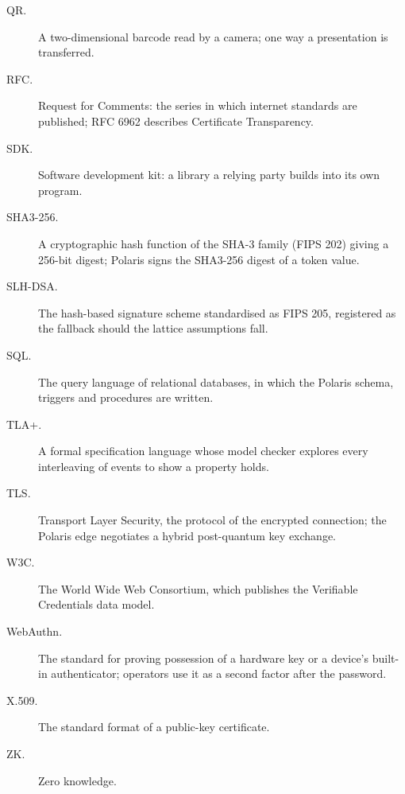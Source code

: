 \begin{description}
  \item[QR.] A two-dimensional barcode read by a camera; one way a presentation is transferred.
  \item[RFC.] Request for Comments: the series in which internet standards are published; RFC 6962 describes Certificate Transparency.
  \item[SDK.] Software development kit: a library a relying party builds into its own program.
  \item[SHA3-256.] A cryptographic hash function of the SHA-3 family (FIPS 202) giving a 256-bit digest; Polaris signs the SHA3-256 digest of a token value.
  \item[SLH-DSA.] The hash-based signature scheme standardised as FIPS 205, registered as the fallback should the lattice assumptions fall.
  \item[SQL.] The query language of relational databases, in which the Polaris schema, triggers and procedures are written.
  \item[TLA+.] A formal specification language whose model checker explores every interleaving of events to show a property holds.
  \item[TLS.] Transport Layer Security, the protocol of the encrypted connection; the Polaris edge negotiates a hybrid post-quantum key exchange.
  \item[W3C.] The World Wide Web Consortium, which publishes the Verifiable Credentials data model.
  \item[WebAuthn.] The standard for proving possession of a hardware key or a device's built-in authenticator; operators use it as a second factor after the password.
  \item[X.509.] The standard format of a public-key certificate.
  \item[ZK.] Zero knowledge.
\end{description}
